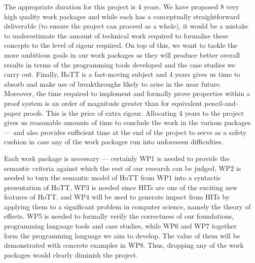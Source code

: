 \documentclass[a4paper,11pt]{article}
\begin{document}
 The appropriate duration for
this project is 4 years. We have proposed 8 very high quality work
packages and while each has a conceptually straightforward deliverable
(to ensure the project can proceed as a whole), it would be a mistake
to underestimate the amount of technical work required to formalise
these concepts to the level of rigour required. On top of this, we
want to tackle the more ambitious goals in our work packages as they
will produce better overall results in terms of the programming tools
developed and the case studies we carry out. Finally, HoTT is a
fast-moving subject and 4 years gives us time to absorb and make use
of breakthroughs likely to arise in the near future.  Moreover, the
time required to implement and formally prove properties within a
proof system is an order of magnitude greater than for equivalent
pencil-and-paper proofs. This is the price of extra rigour. Allocating
4 years to the project gives us reasonable amounts of time to conclude
the work in the various packages --- and also provides sufficient time
at the end of the project to serve as a safety cushion in case any of
the work packages run into unforeseen difficulties.


\noindent Each work package is necessary --- certainly WP1 is needed
to provide the semantic criteria against which the rest of our
research can be judged, WP2 is needed to turn the semantic model of
HoTT from WP1 into a syntactic presentation of HoTT, WP3 is needed
since HITs are one of the exciting new features of HoTT, and WP4 will
be used to generate impact from HITs by applying them to a significant
problem in computer science, namely the theory of effects. WP5 is
needed to formally verify the correctness of our foundations,
programming language tools and case studies, while WP6
and WP7 together form the programming language we aim to develop. The
value of them will be demonstrated with concrete examples in WP8.
Thus, dropping any of the work packages would clearly diminish the
project.

\vspace{0.02in}
\end{document}
